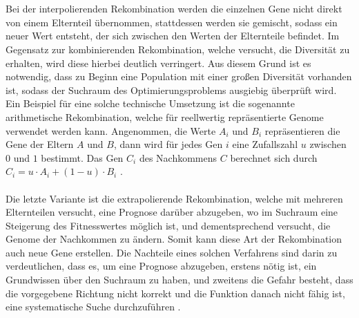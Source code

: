 \\\\
Bei der interpolierenden Rekombination werden die einzelnen Gene nicht direkt von einem Elternteil übernommen, stattdessen werden sie gemischt, sodass ein neuer Wert entsteht, der sich zwischen den Werten der Elternteile befindet. Im Gegensatz zur kombinierenden Rekombination, welche versucht, die Diversität zu erhalten, wird diese hierbei deutlich verringert. Aus diesem Grund ist es notwendig, dass zu Beginn eine Population mit einer großen Diversität vorhanden ist, sodass der Suchraum  des Optimierungsproblems ausgiebig überprüft wird. Ein Beispiel für eine solche technische Umsetzung ist die sogenannte arithmetische Rekombination, welche für reellwertig repräsentierte Genome verwendet werden kann. Angenommen, die Werte $A_i$ und $B_i$ repräsentieren die Gene der Eltern $A$ und $B$, dann wird für jedes Gen $i$ eine Zufallszahl $u$ zwischen $0$ und $1$ bestimmt. Das Gen $C_i$ des Nachkommens $C$ berechnet sich durch $C_i=u \cdot A_i + (1-u) \cdot B_i$ \cite{weicker2015evolutionare}.
\\\\
Die letzte Variante ist die extrapolierende Rekombination, welche mit mehreren Elternteilen versucht, eine Prognose darüber abzugeben, wo im Suchraum eine Steigerung des Fitnesswertes möglich ist, und dementsprechend versucht, die Genome der Nachkommen zu ändern. Somit kann diese Art der Rekombination auch neue Gene erstellen. Die Nachteile eines solchen Verfahrens sind darin zu verdeutlichen, dass es, um eine Prognose abzugeben, erstens nötig ist, ein Grundwissen über den Suchraum zu haben, und zweitens die Gefahr besteht, dass die vorgegebene Richtung nicht korrekt und die Funktion danach nicht fähig ist, eine systematische Suche durchzuführen \cite{weicker2015evolutionare}.   

